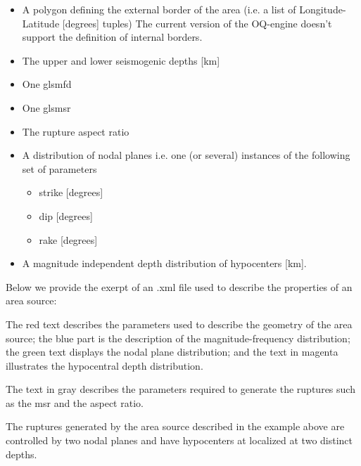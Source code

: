 \begin{itemize}

    \item A polygon defining the external border of the area (i.e. a list of
    Longitude-Latitude [degrees] tuples) The current version of the OQ-engine doesn't
    support the definition of internal borders.

    \item The upper and lower seismogenic depths [km]

    \item One gls{mfd}

    \item One gls{msr}

    \item The rupture aspect ratio

    \item A distribution of nodal planes i.e. one (or several) instances of
    the following set of parameters

    \begin{itemize}
        \item \gls{strike} [degrees]
        \item \gls{dip} [degrees]
        \item \gls{rake} [degrees]
    \end{itemize}

    \item A magnitude independent depth distribution of hypocenters [km].

\end{itemize}

Below we provide the exerpt of an .xml file used to describe the properties of
an area source:



The red text describes the parameters used to describe the geometry of the
area source; the blue part is the description of the magnitude-frequency
distribution; the green text displays the nodal plane distribution; and the
text in magenta illustrates the hypocentral depth distribution.

The text in gray describes the parameters required to generate the ruptures
such as the \gls{msr} and the aspect ratio.

The ruptures generated by the area source described in the example above are
controlled by two nodal planes and have hypocenters at localized at two
distinct depths.